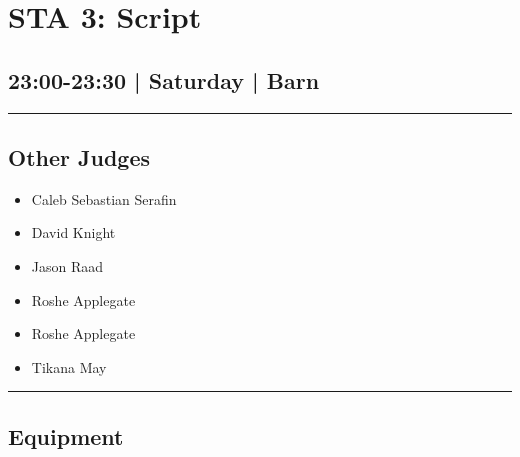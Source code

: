 \documentclass[10pt, A5]{article}
\begin{document}
        \begin{framed}
        \begin{minipage}{\textwidth}

        \setcounter{section}{50}
        \section{STA 3: Script}
        \subsection*{23:00-23:30 | Saturday | Barn}

        \vspace{0.25cm}
        \hrule
        \vspace{0.25cm}


        \subsection*{Other Judges}
                    

        	\begin{multicols}{2}

		\begin{itemize}
									\item Caleb Sebastian Serafin
									\item David Knight
									\item Jason Raad
									\item Roshe Applegate
						\end{itemize}

		\vfill\null
		\columnbreak

		\begin{itemize}
									\item Roshe Applegate
									\item Tikana May
						\end{itemize}

		\vfill\null

		\end{multicols}

    \vspace{0.25cm}
        \hrule
        \vspace{0.25cm}

        \begin{multicols}{2}

		\section*{\faWrench \: Equipment}


\end{multicols}
\end{minipage}
\end{framed}
\end{document}
